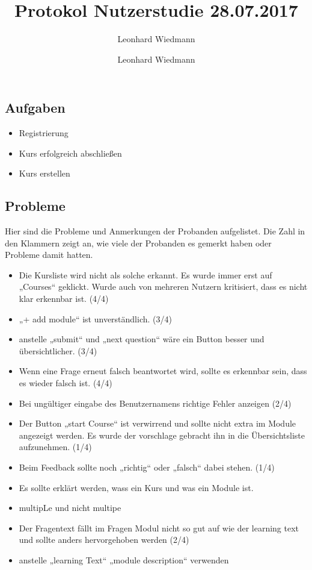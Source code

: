 \documentclass[colorback, accentcolor=tud1c, paper=a4]{tudexercise}
\title{Protokol Nutzerstudie 28.07.2017}
\subtitle{Leonhard Wiedmann}
\author{Leonhard Wiedmann}
\begin{document}
\maketitle
\subsection*{Aufgaben}
	\begin{itemize}
	\item Registrierung
  \item Kurs erfolgreich abschließen
  \item Kurs erstellen
	\end{itemize}

\subsection*{Probleme}
  Hier sind die Probleme und Anmerkungen der Probanden aufgelistet. Die Zahl in den Klammern zeigt an, wie viele der Probanden es gemerkt haben oder Probleme damit hatten.
  \begin{itemize}
    \item Die Kursliste wird nicht als solche erkannt. Es wurde immer erst auf „Courses“ geklickt. Wurde auch von mehreren Nutzern kritisiert, dass es nicht klar erkennbar ist. (4/4)
    \item „+ add module“ ist unverständlich. (3/4)
    \item anstelle „submit“ und „next question“ wäre ein Button besser und übersichtlicher. (3/4)
    \item Wenn eine Frage erneut falsch beantwortet wird, sollte es erkennbar sein, dass es wieder falsch ist. (4/4)
    \item Bei ungültiger eingabe des Benutzernamens richtige Fehler anzeigen (2/4)
    \item Der Button „start Course“ ist verwirrend und sollte nicht extra im Module angezeigt werden. Es wurde der vorschlage gebracht ihn in die Übersichtsliste aufzunehmen. (1/4)
    \item Beim Feedback sollte noch „richtig“ oder „falsch“ dabei stehen. (1/4)
    \item Es sollte erklärt werden, wass ein Kurs und was ein Module ist.
    \item multipLe und nicht multipe
    \item Der Fragentext fällt im Fragen Modul nicht so gut auf wie der learning text und sollte anders hervorgehoben werden (2/4)
    \item anstelle „learning Text“ „module description“ verwenden
   \end{itemize}
\end{document}
